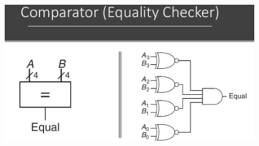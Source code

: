 \documentclass{article}[12pt]
\begin{document}
\begin{figure}[htbp]
\centerline{\includegraphics[scale=0.3]{../Images/comp.png}}
\end{figure}
\end{document}
